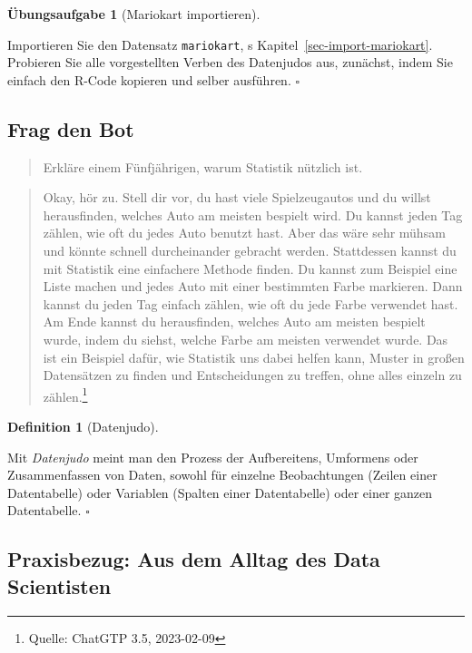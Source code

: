 \documentclass[
  letterpaper,
  twoside,
  open=any]{scrbook}
\theoremstyle{definition}
\newtheorem{exercise}{Übungsaufgabe}[chapter]
\theoremstyle{definition}
\theoremstyle{definition}
\newtheorem{definition}{Definition}[chapter]
\theoremstyle{remark}
\begin{document}
\begin{exercise}[Mariokart
importieren]\protect\hypertarget{exr-los}{}\label{exr-los}

Importieren Sie den Datensatz \texttt{mariokart}, s
Kapitel~\ref{sec-import-mariokart}. Probieren Sie alle vorgestellten
Verben des Datenjudos aus, zunächst, indem Sie einfach den R-Code
kopieren und selber ausführen. \(\square\)

\end{exercise}

\subsection{Frag den Bot}\label{frag-den-bot}

\begin{quote}
{} Erkläre einem Fünfjährigen, warum Statistik nützlich
ist.
\end{quote}

\begin{quote}
{} Okay, hör zu. Stell dir vor, du hast viele
Spielzeugautos und du willst herausfinden, welches Auto am meisten
bespielt wird. Du kannst jeden Tag zählen, wie oft du jedes Auto benutzt
hast. Aber das wäre sehr mühsam und könnte schnell durcheinander
gebracht werden. Stattdessen kannst du mit Statistik eine einfachere
Methode finden. Du kannst zum Beispiel eine Liste machen und jedes Auto
mit einer bestimmten Farbe markieren. Dann kannst du jeden Tag einfach
zählen, wie oft du jede Farbe verwendet hast. Am Ende kannst du
herausfinden, welches Auto am meisten bespielt wurde, indem du siehst,
welche Farbe am meisten verwendet wurde. Das ist ein Beispiel dafür, wie
Statistik uns dabei helfen kann, Muster in großen Datensätzen zu finden
und Entscheidungen zu treffen, ohne alles einzeln zu zählen.\footnote{Quelle:
  ChatGTP 3.5, 2023-02-09}
\end{quote}

\begin{definition}[Datenjudo]\protect\hypertarget{def-datenjudo}{}\label{def-datenjudo}

Mit \emph{Datenjudo} meint man den Prozess der Aufbereitens, Umformens
oder Zusammenfassen von Daten, sowohl für einzelne Beobachtungen (Zeilen
einer Datentabelle) oder Variablen (Spalten einer Datentabelle) oder
einer ganzen Datentabelle. \(\square\)

\end{definition}

\subsection{Praxisbezug: Aus dem Alltag des Data
Scientisten}\label{praxisbezug-aus-dem-alltag-des-data-scientisten}
\end{document}
